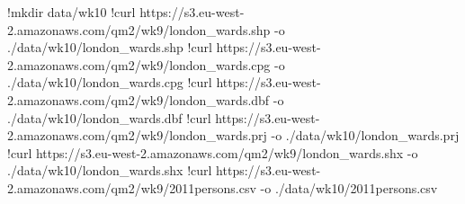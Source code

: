 \documentclass[
  letterpaper,
  DIV=11,
  numbers=noendperiod]{scrreprt}
\newenvironment{Shaded}{\begin{snugshade}}{\end{snugshade}}
\newcommand{\DecValTok}[1]{\textcolor[rgb]{0.68,0.00,0.00}{#1}}
\newcommand{\ErrorTok}[1]{\textcolor[rgb]{0.68,0.00,0.00}{#1}}
\newcommand{\FloatTok}[1]{\textcolor[rgb]{0.68,0.00,0.00}{#1}}
\newcommand{\NormalTok}[1]{\textcolor[rgb]{0.00,0.23,0.31}{#1}}
\newcommand{\OperatorTok}[1]{\textcolor[rgb]{0.37,0.37,0.37}{#1}}
\begin{document}
\begin{Shaded}
\begin{Highlighting}[]
\OperatorTok{!}\NormalTok{mkdir data}\OperatorTok{/}\NormalTok{wk10}
\OperatorTok{!}\NormalTok{curl https:}\OperatorTok{//}\NormalTok{s3.eu}\OperatorTok{{-}}\NormalTok{west}\OperatorTok{{-}}\FloatTok{2.}\ErrorTok{amazonaws}\NormalTok{.com}\OperatorTok{/}\NormalTok{qm2}\OperatorTok{/}\NormalTok{wk9}\OperatorTok{/}\NormalTok{london\_wards.shp }\OperatorTok{{-}}\NormalTok{o .}\OperatorTok{/}\NormalTok{data}\OperatorTok{/}\NormalTok{wk10}\OperatorTok{/}\NormalTok{london\_wards.shp}
\OperatorTok{!}\NormalTok{curl https:}\OperatorTok{//}\NormalTok{s3.eu}\OperatorTok{{-}}\NormalTok{west}\OperatorTok{{-}}\FloatTok{2.}\ErrorTok{amazonaws}\NormalTok{.com}\OperatorTok{/}\NormalTok{qm2}\OperatorTok{/}\NormalTok{wk9}\OperatorTok{/}\NormalTok{london\_wards.cpg }\OperatorTok{{-}}\NormalTok{o .}\OperatorTok{/}\NormalTok{data}\OperatorTok{/}\NormalTok{wk10}\OperatorTok{/}\NormalTok{london\_wards.cpg}
\OperatorTok{!}\NormalTok{curl https:}\OperatorTok{//}\NormalTok{s3.eu}\OperatorTok{{-}}\NormalTok{west}\OperatorTok{{-}}\FloatTok{2.}\ErrorTok{amazonaws}\NormalTok{.com}\OperatorTok{/}\NormalTok{qm2}\OperatorTok{/}\NormalTok{wk9}\OperatorTok{/}\NormalTok{london\_wards.dbf }\OperatorTok{{-}}\NormalTok{o .}\OperatorTok{/}\NormalTok{data}\OperatorTok{/}\NormalTok{wk10}\OperatorTok{/}\NormalTok{london\_wards.dbf}
\OperatorTok{!}\NormalTok{curl https:}\OperatorTok{//}\NormalTok{s3.eu}\OperatorTok{{-}}\NormalTok{west}\OperatorTok{{-}}\FloatTok{2.}\ErrorTok{amazonaws}\NormalTok{.com}\OperatorTok{/}\NormalTok{qm2}\OperatorTok{/}\NormalTok{wk9}\OperatorTok{/}\NormalTok{london\_wards.prj }\OperatorTok{{-}}\NormalTok{o .}\OperatorTok{/}\NormalTok{data}\OperatorTok{/}\NormalTok{wk10}\OperatorTok{/}\NormalTok{london\_wards.prj}
\OperatorTok{!}\NormalTok{curl https:}\OperatorTok{//}\NormalTok{s3.eu}\OperatorTok{{-}}\NormalTok{west}\OperatorTok{{-}}\FloatTok{2.}\ErrorTok{amazonaws}\NormalTok{.com}\OperatorTok{/}\NormalTok{qm2}\OperatorTok{/}\NormalTok{wk9}\OperatorTok{/}\NormalTok{london\_wards.shx }\OperatorTok{{-}}\NormalTok{o .}\OperatorTok{/}\NormalTok{data}\OperatorTok{/}\NormalTok{wk10}\OperatorTok{/}\NormalTok{london\_wards.shx}
\OperatorTok{!}\NormalTok{curl https:}\OperatorTok{//}\NormalTok{s3.eu}\OperatorTok{{-}}\NormalTok{west}\OperatorTok{{-}}\FloatTok{2.}\ErrorTok{amazonaws}\NormalTok{.com}\OperatorTok{/}\NormalTok{qm2}\OperatorTok{/}\NormalTok{wk9}\OperatorTok{/}\DecValTok{2011}\ErrorTok{persons}\NormalTok{.csv }\OperatorTok{{-}}\NormalTok{o .}\OperatorTok{/}\NormalTok{data}\OperatorTok{/}\NormalTok{wk10}\OperatorTok{/}\DecValTok{2011}\ErrorTok{persons}\NormalTok{.csv}

\end{Highlighting}
\end{Shaded}
\end{document}

